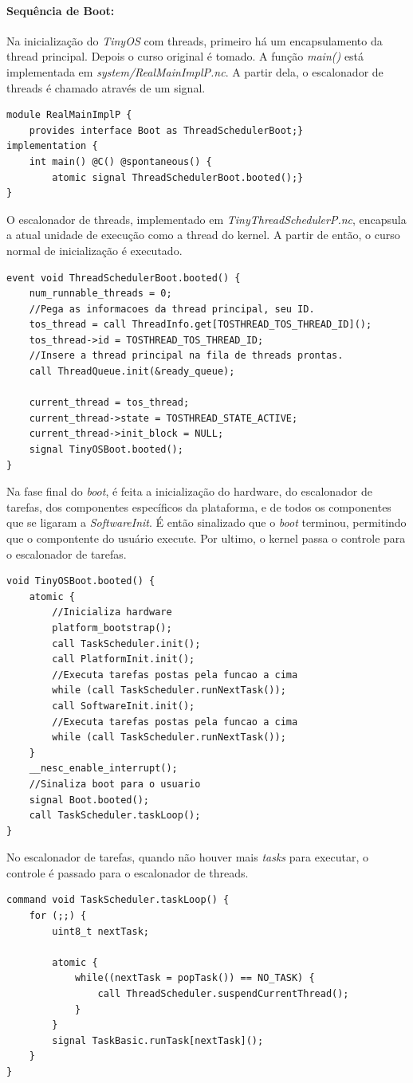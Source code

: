 \paragraph{Sequência de Boot:}
Na inicialização do \textit{TinyOS} com threads, primeiro há um encapsulamento da thread principal. Depois o curso
original é tomado.
A função \textit{main()} está implementada em \textit{system/RealMainImplP.nc}. A partir dela, o escalonador de threads
é chamado através de um signal.
\begin{lstlisting}
module RealMainImplP {
    provides interface Boot as ThreadSchedulerBoot;}
implementation {
    int main() @C() @spontaneous() {
        atomic signal ThreadSchedulerBoot.booted();}
}
\end{lstlisting}
O escalonador de threads, implementado em \textit{TinyThreadSchedulerP.nc}, encapsula a atual unidade de execução
como a thread do kernel. A partir de então, o curso normal de inicialização é executado. 
\begin{lstlisting}
event void ThreadSchedulerBoot.booted() {
    num_runnable_threads = 0;
    //Pega as informacoes da thread principal, seu ID.
    tos_thread = call ThreadInfo.get[TOSTHREAD_TOS_THREAD_ID]();
    tos_thread->id = TOSTHREAD_TOS_THREAD_ID;
    //Insere a thread principal na fila de threads prontas.
    call ThreadQueue.init(&ready_queue);

    current_thread = tos_thread;
    current_thread->state = TOSTHREAD_STATE_ACTIVE;
    current_thread->init_block = NULL;
    signal TinyOSBoot.booted();
}
\end{lstlisting}
Na fase final do \textit{boot}, é feita a inicialização do hardware, do escalonador de tarefas, dos componentes
específicos da plataforma, e de todos os componentes que se ligaram a \textit{SoftwareInit}. É então sinalizado que o 
\textit{boot} terminou, permitindo que o compontente do usuário execute. Por ultimo, o kernel passa o controle para o
escalonador de tarefas.
\begin{lstlisting}
void TinyOSBoot.booted() {
    atomic {
        //Inicializa hardware
        platform_bootstrap();
        call TaskScheduler.init();
        call PlatformInit.init();
        //Executa tarefas postas pela funcao a cima
        while (call TaskScheduler.runNextTask());
        call SoftwareInit.init();
        //Executa tarefas postas pela funcao a cima
        while (call TaskScheduler.runNextTask());
    }
    __nesc_enable_interrupt();
    //Sinaliza boot para o usuario
    signal Boot.booted();
    call TaskScheduler.taskLoop();
}
\end{lstlisting}
No escalonador de tarefas, quando não houver mais \textit{tasks} para executar, o controle é passado para o escalonador
de threads.
\begin{lstlisting}
command void TaskScheduler.taskLoop() {
    for (;;) {
        uint8_t nextTask;

        atomic {
            while((nextTask = popTask()) == NO_TASK) {
                call ThreadScheduler.suspendCurrentThread();
            }
        }
        signal TaskBasic.runTask[nextTask]();
    }
}
\end{lstlisting}

